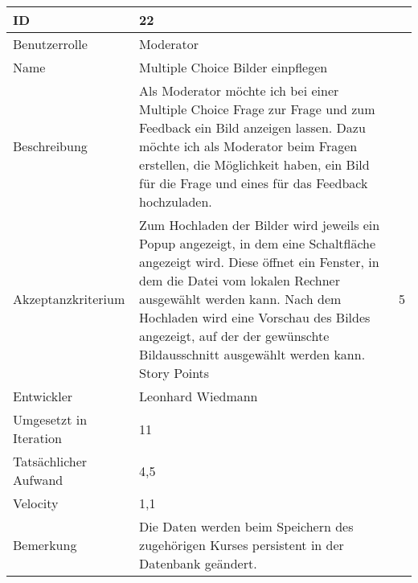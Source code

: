 \begin{tabularx}{\textwidth}{|p{}|X|}
	\hline
	ID & 22\\
	\hline
	Benutzerrolle & Moderator\\
	\hline
	Name & Multiple Choice Bilder einpflegen\\
	\hline
	Beschreibung & Als Moderator möchte ich bei einer Multiple Choice Frage zur Frage und zum Feedback ein Bild anzeigen lassen. Dazu möchte ich als Moderator beim Fragen erstellen, die Möglichkeit haben, ein Bild für die Frage und eines für das Feedback hochzuladen. \\
	\hline
	Akzeptanzkriterium & Zum Hochladen der Bilder wird jeweils ein Popup angezeigt, in dem eine Schaltfläche angezeigt wird. Diese öffnet ein Fenster, in dem die Datei vom lokalen Rechner ausgewählt werden kann. Nach dem Hochladen wird eine Vorschau des Bildes angezeigt, auf der der gewünschte Bildausschnitt ausgewählt werden kann.
	\hline
	Story Points & 5 \\
	\hline
	Entwickler &  Leonhard Wiedmann\\
	\hline
	Umgesetzt in Iteration & 11\\
	\hline
	Tatsächlicher Aufwand & 4,5\\
	\hline
	Velocity & 1,1\\
	\hline
	Bemerkung & Die Daten werden beim Speichern des zugehörigen Kurses persistent in der Datenbank geändert.\\
	\hline
\end{tabularx}
\vspace{20pt}
